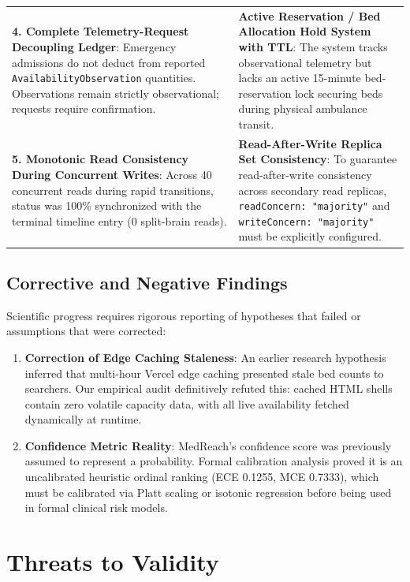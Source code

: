 \documentclass[conference]{IEEEtran}
\begin{document}
\begin{table}[t]
\begin{tabularx}{\textwidth}{X X}
\textbf{4. Complete Telemetry-Request Decoupling Ledger}: Emergency admissions do not deduct from reported \texttt{AvailabilityObservation} quantities. Observations remain strictly observational; requests require confirmation. & \textbf{Active Reservation / Bed Allocation Hold System with TTL}: The system tracks observational telemetry but lacks an active 15-minute bed-reservation lock securing beds during physical ambulance transit. \\
\addlinespace
\textbf{5. Monotonic Read Consistency During Concurrent Writes}: Across 40 concurrent reads during rapid transitions, status was 100\% synchronized with the terminal timeline entry (0 split-brain reads). & \textbf{Read-After-Write Replica Set Consistency}: To guarantee read-after-write consistency across secondary read replicas, \texttt{readConcern: "majority"} and \texttt{writeConcern: "majority"} must be explicitly configured. \\
\bottomrule
\end{tabularx}
\end{table}

\subsection{Corrective and Negative Findings}
Scientific progress requires rigorous reporting of hypotheses that failed or assumptions that were corrected:
\begin{enumerate}
    \item \textbf{Correction of Edge Caching Staleness}: An earlier research hypothesis inferred that multi-hour Vercel edge caching presented stale bed counts to searchers. Our empirical audit definitively refuted this: cached HTML shells contain zero volatile capacity data, with all live availability fetched dynamically at runtime.
    \item \textbf{Confidence Metric Reality}: MedReach's confidence score was previously assumed to represent a probability. Formal calibration analysis proved it is an uncalibrated heuristic ordinal ranking (ECE 0.1255, MCE 0.7333), which must be calibrated via Platt scaling or isotonic regression before being used in formal clinical risk models.
\end{enumerate}

\section{Threats to Validity}
\end{document}
